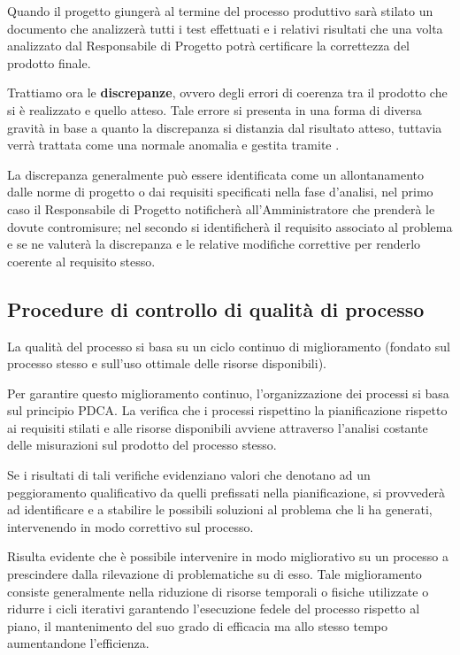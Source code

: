 Quando il progetto \caName{} giungerà al termine del processo produttivo sarà stilato un documento che analizzerà tutti i test effettuati e i relativi risultati che una volta analizzato dal Responsabile di Progetto potrà certificare la correttezza del prodotto finale.

Trattiamo ora le \textbf{discrepanze}, ovvero degli errori di coerenza tra il prodotto che si è realizzato e quello atteso. Tale errore si presenta in una forma di diversa gravità in base a quanto la discrepanza si distanzia dal risultato atteso, tuttavia verrà trattata come una normale anomalia e gestita tramite .

La discrepanza generalmente può essere identificata come un allontanamento dalle norme di progetto o dai requisiti specificati nella fase d'analisi, nel primo caso il Responsabile di Progetto notificherà all'Amministratore che prenderà le dovute contromisure; nel secondo si identificherà il requisito associato al problema e se ne valuterà la discrepanza e le relative modifiche correttive per renderlo coerente al requisito stesso.

\subsection{Procedure di controllo di qualità di processo}
La qualità del processo si basa su un ciclo continuo di miglioramento (fondato sul processo stesso e sull'uso ottimale delle risorse disponibili). 

Per garantire questo miglioramento continuo, l'organizzazione dei processi si basa sul principio PDCA\@. La verifica che i processi rispettino la pianificazione rispetto ai requisiti stilati e alle risorse disponibili avviene attraverso l'analisi costante delle misurazioni sul prodotto del processo stesso.

Se i risultati di tali verifiche evidenziano valori che denotano ad un peggioramento qualificativo da quelli prefissati nella pianificazione, si provvederà ad identificare e a stabilire le possibili soluzioni al problema che li ha generati, intervenendo in modo correttivo sul processo. \

Risulta evidente che è possibile intervenire in modo migliorativo su un processo a prescindere dalla rilevazione di problematiche su di esso. Tale miglioramento consiste generalmente nella riduzione di risorse temporali o fisiche utilizzate o ridurre i cicli iterativi garantendo l'esecuzione fedele del processo rispetto al piano, il mantenimento del suo grado di efficacia ma allo stesso tempo aumentandone l'efficienza.
\clearpage
\clearpage

